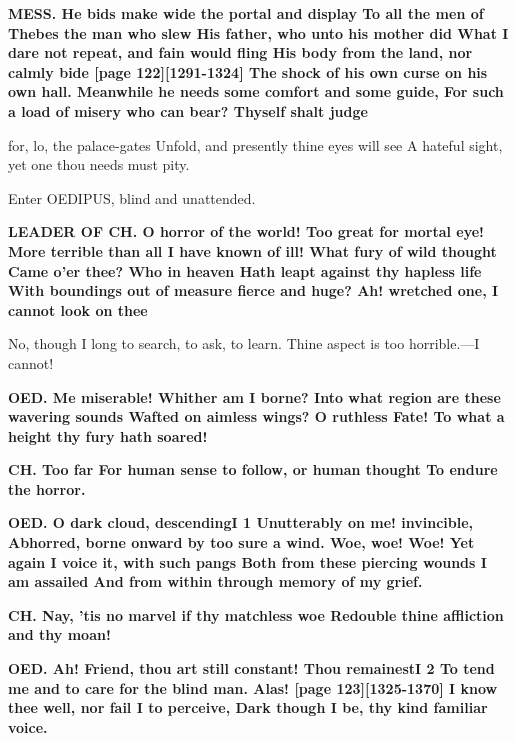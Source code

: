 \documentclass[11pt,letter]{book}
\begin{document}
\par \textbf{MESS. He bids make wide the portal and display To all the men of Thebes the man who slew His father, who unto his mother did What I dare not repeat, and fain would fling His body from the land, nor calmly bide [page 122][1291-1324] The shock of his own curse on his own hall. Meanwhile he needs some comfort and some guide, For such a load of misery who can bear? Thyself shalt judge}
\par   for, lo, the palace-gates Unfold, and presently thine eyes will see A hateful sight, yet one thou needs must pity.

\par  Enter OEDIPUS, blind and unattended.

\par \textbf{LEADER OF CH. O horror of the world! Too great for mortal eye! More terrible than all I have known of ill! What fury of wild thought Came o’er thee? Who in heaven Hath leapt against thy hapless life With boundings out of measure fierce and huge? Ah! wretched one, I cannot look on thee}
\par   No, though I long to search, to ask, to learn. Thine aspect is too horrible.—I cannot!

\par \textbf{OED. Me miserable! Whither am I borne? Into what region are these wavering sounds Wafted on aimless wings? O ruthless Fate! To what a height thy fury hath soared!}
\par 

\par \textbf{CH. Too far For human sense to follow, or human thought To endure the horror.}
\par 

\par \textbf{OED. O dark cloud, descendingI 1 Unutterably on me! invincible, Abhorred, borne onward by too sure a wind. Woe, woe! Woe! Yet again I voice it, with such pangs Both from these piercing wounds I am assailed And from within through memory of my grief.}
\par 

\par \textbf{CH. Nay, ’tis no marvel if thy matchless woe Redouble thine affliction and thy moan!}
\par 

\par \textbf{OED. Ah! Friend, thou art still constant! Thou remainestI 2 To tend me and to care for the blind man. Alas! [page 123][1325-1370] I know thee well, nor fail I to perceive, Dark though I be, thy kind familiar voice.}
\par 
\end{document}
